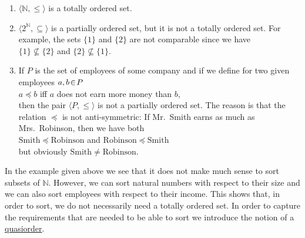 \examples
\begin{enumerate}
\item $\langle\mathbb{N}, \leq \rangle$ is a totally ordered set.
\item $\langle 2^{\mathbb{N}}, \subseteq \rangle$ is a partially ordered set, but it is not a totally
      ordered set.  For example, the sets $\{1\}$ and $\{2\}$ are not comparable since we have
      \\[0.2cm]
      \hspace*{1.3cm}
      $\{1\} \not\subseteq \{2\}$ \quad and \quad  $\{2\} \not\subseteq \{1\}$.
\item If $P$ is the set of employees of some company and if we define for two given employees
      $a,b \!\in\! P$
      \\[0.2cm]
      \hspace*{1.3cm}
      $a \preceq b$ \quad iff \quad  $a$ does not earn more money than $b$, 
      \\[0.2cm]
      then the pair $\langle P, \leq \rangle$ is not a partially ordered set.  The reason is that
      the relation $\preceq$ is not anti-symmetric:  If Mr.~Smith earns as much as
      Mrs.~Robinson, then we have both
      \\[0.2cm]
      \hspace*{1.3cm}
      $\mathrm{Smith} \preceq \mathrm{Robinson}$ \quad and \quad $\mathrm{Robinson} \preceq \mathrm{Smith}$
      \\[0.2cm]
      but obviously $\mathrm{Smith} \not= \mathrm{Robinson}$.
\end{enumerate}
In the example given above we see that it does not make much sense to sort subsets of $\mathbb{N}$.
However, we can sort natural numbers with respect to their size and we can also sort employees with
respect to their income.  This shows that, in order to sort,  we do not necessarily need a totally
ordered set.  In order to capture the requirements that are needed to be able to sort we introduce
the notion of a \href{http://en.wikipedia.org/wiki/Preorder}{quasiorder}.

